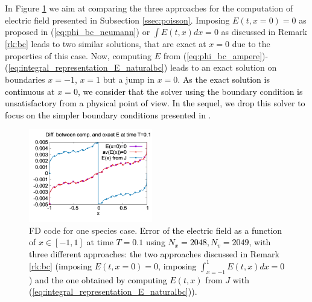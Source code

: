 \documentclass{article}
\numberwithin{equation}{section}
\newcommand{\imh}{\textheight} %
\begin{document}
In Figure \ref{fig:DF_fe_and_bc} 
we aim at comparing the three approaches for the computation of electric field presented in Subsection \ref{ssec:poisson}. Imposing $E(t,x=0)=0$ as proposed in (\ref{eq:phi_bc_neumann}) or $\int E(t,x)dx=0$ as discussed in Remark \ref{rk:bc} leads to two similar solutions, that are exact at $x=0$ due to the properties of this  case. Now, computing $E$ from (\ref{eq:phi_bc_ampere})-(\ref{eq:integral_representation_E_naturalbc}) leads to an exact solution on boundaries $x=-1$, $x=1$ but a jump in $x=0$. \textcolor{black}{As the exact solution is continuous at $x=0$, we consider that the solver  using the boundary condition  is unsatisfactory from a physical point of view. In the sequel, we drop this solver to focus on the simpler boundary conditions presented in .}

\begin{figure}
	\centering
	\renewcommand{\imh}{0.33\linewidth}
	\includegraphics[width=0.48\textwidth]{images/diff_E_3bc_acstcase.png}
	\caption{FD code for one species case. \textcolor{black}{Error of the electric field as a function of $x\in [-1,1]$ at time $T=0.1$ using  $N_x=2048, N_v=2049$, with  three different approaches: the two approaches discussed in Remark \ref{rk:bc} (imposing $E(t,x=0)=0$, imposing $\int_{x=-1}^1 E(t,x)dx=0$)  and the one obtained by computing $E(t,x)$ from $J$ with (\ref{eq:integral_representation_E_naturalbc})).} \\   %
	}
	\label{fig:DF_fe_and_bc}
\end{figure}
\end{document}
